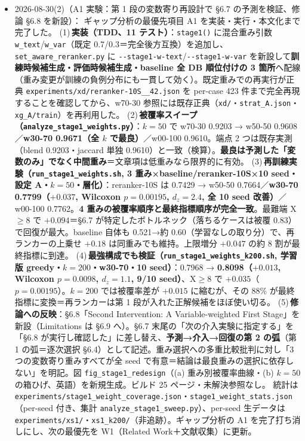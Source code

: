 \documentclass[11pt,a4paper]{jsarticle}
\begin{document}
\begin{itemize}[nosep]
  \item 2026-08-30(2)（A1 実験：第 1 段の変数寄り再設計で \S6.7 の予測を検証、修論 \S6.8 を新設）：
    ギャップ分析の最優先項目 A1 を実装・実行・本文化まで完了した。
    (1)\,\textbf{実装（TDD、11 テスト）}：\texttt{stage1()} に混合重み引数 \texttt{w\_text}/\texttt{w\_var}（既定 0.7/0.3＝完全後方互換）を追加し、\texttt{set\_aware\_reranker.py} に \texttt{-{}-stage1-w-text}/\texttt{-{}-stage1-w-var} を新設して\textbf{訓練時候補生成・評価時候補生成・baseline 全 DB 順位付けの 3 箇所}へ配線（重み変更が訓練の負例分布にも一貫して効く）。既定重みでの再実行が正典 \texttt{experiments/xd/reranker-10S\_\_42.json} を per-case 423 件まで完全再現することを確認してから、w70-30 参照には既存正典（\texttt{xd/}・\texttt{strat\_A.json}・\texttt{xg\_A/train}）を再利用した。
    (2)\,\textbf{被覆率スイープ（\texttt{analyze\_stage1\_weights.py}）}：$k=50$ で w70-30 0.9203 → w50-50 0.9608／\textbf{w30-70 0.9671（全 $k$ で最良）}／w00-100 0.9610。端点 2 つは既存実測（blend 0.9203・jaccard 単独 0.9610）と一致（検算）。\textbf{最良は予測した「変数のみ」でなく中間重み}＝文章項は低重みなら限界的に有効。
    (3)\,\textbf{再訓練実験（\texttt{run\_stage1\_weights.sh}, 3 重み×baseline/reranker-10S×10 seed・設定 A・$k=50$・層化）}：reranker-10S は 0.7429 → w50-50 0.7664／\textbf{w30-70 0.7799（$+0.037$, Wilcoxon $p=0.00195$, $d_z=2.4$, 全 10 seed 改善）}／w00-100 0.7762。\textbf{4 重みの被覆率順序と最終指標順序が完全一致}。最難端 X$\ge$8 で $+0.094$＝\S6.7 が特定したボトルネック（落ちるケースは被覆 0.83）で回復が最大。baseline 自体も 0.521→約 0.60（学習なしの取り分）で、再ランカーの上乗せ $+0.18$ は同重みでも維持。上限増分 $+0.047$ の約 8 割が最終指標に到達。
    (4)\,\textbf{最強構成でも検証（\texttt{run\_stage1\_weights\_k200.sh}, 学習版 greedy・$k=200$・w30-70・10 seed）}：0.7968 → \textbf{0.8098（$+0.013$, Wilcoxon $p=0.0098$, $d_z=1.1$, 9/10 seed）}、X$\ge$8 で $+0.035$（$p=0.00195$）。$k=200$ では被覆率差が $+0.015$ に縮むが、その 88\% が最終指標に変換＝再ランカーは第 1 段が入れた正解候補をほぼ使い切る。
    (5)\,\textbf{修論への反映}：\S6.8「Second Intervention: A Variable-weighted First Stage」を新設（Limitations は \S6.9 へ）。\S6.7 末尾の「次の介入実験に指定する」を「\S6.8 が実行し確認した」に差し替え、\textbf{予測→介入→回復の第 2 の弧}（第 1 の弧＝逐次選択 \S6.4）として記述。重み選択への多重比較批判に対し「3 つの変数寄り重みすべてが全 seed で有意＝結論は最良重みの選択に依存しない」を明記。図 \texttt{fig\_stage1\_redesign}（(a) 重み別被覆率曲線・(b) $k=50$ の箱ひげ、英語）を新規生成。ビルド 25 ページ・未解決参照なし。
    統計は \texttt{experiments/stage1\_weight\_coverage.json}・\texttt{stage1\_weight\_stats.json}（per-seed 付き、集計 \texttt{analyze\_stage1\_sweep.py}）、per-seed 生データは \texttt{experiments/xs1/}・\texttt{xs1\_k200/}（非追跡）。ギャップ分析の A1 を完了打ち消しにし、次の最優先を W1（Related Work＋文献収集）に更新。

\end{itemize}
\end{document}
